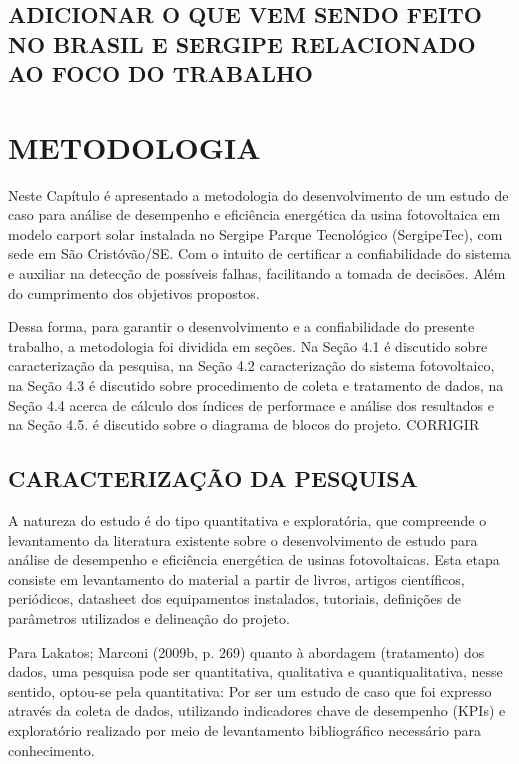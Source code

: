 \section{ADICIONAR O QUE VEM SENDO FEITO NO BRASIL E SERGIPE RELACIONADO AO FOCO DO TRABALHO}

\renewcommand{\chaptername}{} %
\chapter{METODOLOGIA}   %
\label{cap:metodologia}

Neste Capítulo é apresentado a metodologia do desenvolvimento de um estudo de caso para análise de desempenho e eficiência energética da usina fotovoltaica em modelo carport solar instalada no Sergipe Parque Tecnológico (SergipeTec), com sede em São Cristóvão/SE. Com o intuito de certificar a confiabilidade do sistema e auxiliar na detecção de possíveis falhas, facilitando a tomada de decisões. Além do cumprimento dos objetivos propostos. 

Dessa forma, para garantir o desenvolvimento e a confiabilidade do presente trabalho, a metodologia foi dividida em seções. Na Seção 4.1 é discutido sobre caracterização da pesquisa, na Seção 4.2 caracterização do sistema fotovoltaico, na Seção 4.3 é discutido sobre procedimento de coleta e tratamento de dados, na Seção 4.4 acerca de cálculo dos índices de performace e análise dos resultados e na Seção 4.5. é discutido sobre o diagrama de blocos do projeto. CORRIGIR

\section{CARACTERIZAÇÃO DA PESQUISA}

A natureza do estudo é do tipo quantitativa e exploratória, que compreende o levantamento da literatura existente sobre o desenvolvimento de estudo para análise de desempenho e eficiência energética de usinas fotovoltaicas. Esta etapa consiste em levantamento do material a partir de livros, artigos científicos, periódicos, datasheet dos equipamentos instalados, tutoriais, definições de parâmetros utilizados e delineação do projeto.  

Para Lakatos; Marconi (2009b, p. 269) quanto à abordagem (tratamento) dos dados, uma pesquisa pode ser quantitativa, qualitativa e quantiqualitativa, nesse sentido, optou-se pela quantitativa: Por ser um estudo de caso que foi expresso através da coleta de dados, utilizando indicadores chave de desempenho (KPIs) e exploratório realizado por meio de levantamento bibliográfico necessário para conhecimento.

